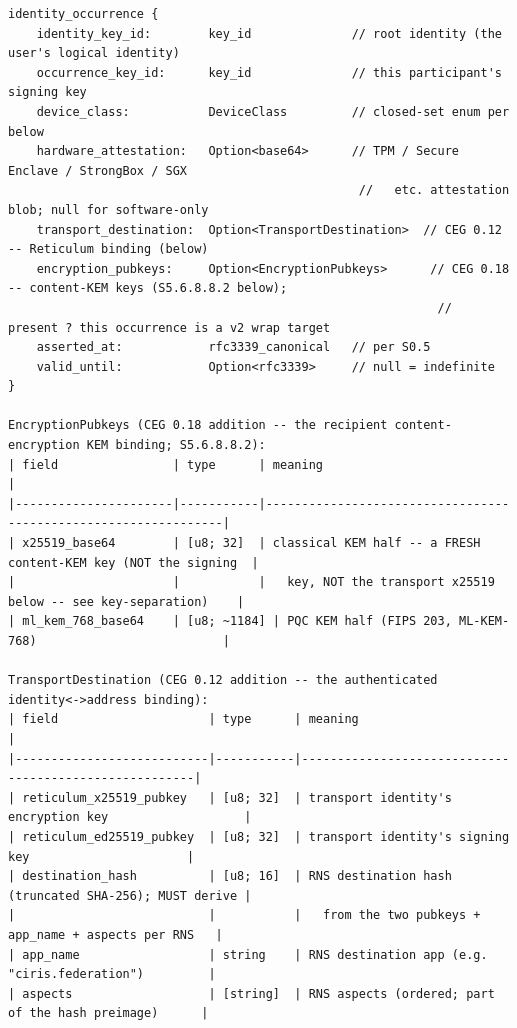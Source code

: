 \documentclass[11pt]{article}
\begin{document}
\begin{lstlisting}
identity_occurrence {
    identity_key_id:        key_id              // root identity (the user's logical identity)
    occurrence_key_id:      key_id              // this participant's signing key
    device_class:           DeviceClass         // closed-set enum per below
    hardware_attestation:   Option<base64>      // TPM / Secure Enclave / StrongBox / SGX
                                                 //   etc. attestation blob; null for software-only
    transport_destination:  Option<TransportDestination>  // CEG 0.12 -- Reticulum binding (below)
    encryption_pubkeys:     Option<EncryptionPubkeys>      // CEG 0.18 -- content-KEM keys (S5.6.8.8.2 below);
                                                            //   present ? this occurrence is a v2 wrap target
    asserted_at:            rfc3339_canonical   // per S0.5
    valid_until:            Option<rfc3339>     // null = indefinite
}

EncryptionPubkeys (CEG 0.18 addition -- the recipient content-encryption KEM binding; S5.6.8.8.2):
| field                | type      | meaning                                                        |
|----------------------|-----------|----------------------------------------------------------------|
| x25519_base64        | [u8; 32]  | classical KEM half -- a FRESH content-KEM key (NOT the signing  |
|                      |           |   key, NOT the transport x25519 below -- see key-separation)    |
| ml_kem_768_base64    | [u8; ~1184] | PQC KEM half (FIPS 203, ML-KEM-768)                          |

TransportDestination (CEG 0.12 addition -- the authenticated identity<->address binding):
| field                     | type      | meaning                                               |
|---------------------------|-----------|-------------------------------------------------------|
| reticulum_x25519_pubkey   | [u8; 32]  | transport identity's encryption key                   |
| reticulum_ed25519_pubkey  | [u8; 32]  | transport identity's signing key                      |
| destination_hash          | [u8; 16]  | RNS destination hash (truncated SHA-256); MUST derive |
|                           |           |   from the two pubkeys + app_name + aspects per RNS   |
| app_name                  | string    | RNS destination app (e.g. "ciris.federation")         |
| aspects                   | [string]  | RNS aspects (ordered; part of the hash preimage)      |


\end{lstlisting}
\end{document}
